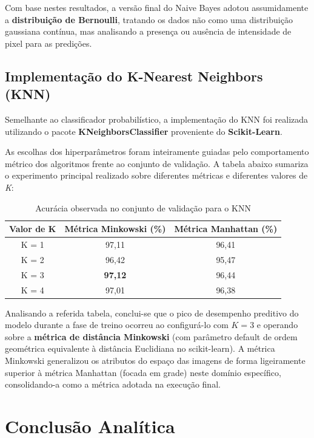 \documentclass[12pt, a4paper]{article}
\begin{document}
Com base nestes resultados, a versão final do Naive Bayes adotou assumidamente a \textbf{distribuição de Bernoulli}, tratando os dados não como uma distribuição gaussiana contínua, mas analisando a presença ou ausência de intensidade de pixel para as predições.

\subsection{Implementação do K-Nearest Neighbors (KNN)}
Semelhante ao classificador probabilístico, a implementação do KNN foi realizada utilizando o pacote \textbf{KNeighborsClassifier} proveniente do \textbf{Scikit-Learn}. 

As escolhas dos hiperparâmetros foram inteiramente guiadas pelo comportamento métrico dos algoritmos frente ao conjunto de validação. A tabela abaixo sumariza o experimento principal realizado sobre diferentes métricas e diferentes valores de \textit{K}:

\begin{table}[h]
\centering
\caption{Acurácia observada no conjunto de validação para o KNN}
\vspace{0.2cm}
\begin{tabular}{ccc}
\toprule
\textbf{Valor de K} & \textbf{Métrica Minkowski (\%)} & \textbf{Métrica Manhattan (\%)} \\
\midrule
K = 1 & 97,11 & 96,41 \\
K = 2 & 96,42 & 95,47 \\
K = 3 & \textbf{97,12} & 96,44 \\
K = 4 & 97,01 & 96,38 \\
\bottomrule
\end{tabular}
\end{table}

Analisando a referida tabela, conclui-se que o pico de desempenho preditivo do modelo durante a fase de treino ocorreu ao configurá-lo com $K = 3$ e operando sobre a \textbf{métrica de distância Minkowski} (com parâmetro default de ordem geométrica equivalente à distância Euclidiana no scikit-learn). A métrica Minkowski generalizou os atributos do espaço das imagens de forma ligeiramente superior à métrica Manhattan (focada em grade) neste domínio específico, consolidando-a como a métrica adotada na execução final.

\section{Conclusão Analítica}
\end{document}
